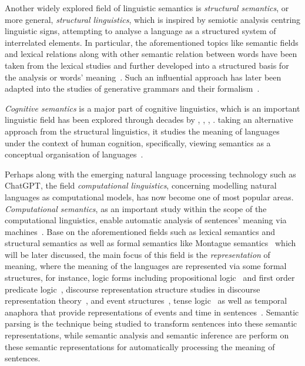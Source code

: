 Another widely explored field of linguistic semantics is \emph{structural semantics}, or more general, \emph{structural linguistics}, which is inspired by  semiotic analysis centring linguistic signs, attempting to analyse a language as a structured system of interrelated elements. In particular, the aforementioned topics like semantic fields and lexical relations along with other semantic relation between words have been taken from the lexical studies and further developed into a structured basis for the analysis or words' meaning~\citep{LexicalSemantics}. Such an influential approach has later been adapted into the studies of generative grammars and their formalism~\citep{Katz1963-KATTSO-3, Chomsky1975-CHOTLS}.

\emph{Cognitive semantics} is a major part of cognitive linguistics, which is an important linguistic field has been explored through decades by \citet{Johnson1987-JOHTBI}, \citet{alma9923109163502466}, \citet{alma993245163502466}, \citet{fauconnier1998}. taking an alternative approach from the structural linguistics, it studies the meaning of languages under the context of human cognition, specifically, viewing semantics as a conceptual organisation of languages~\citep{10.7551/mitpress/6847.001.0001, Croft_Cruse_2004}.

Perhaps along with the emerging natural language processing technology such as ChatGPT, the field \emph{computational linguistics}, concerning modelling natural languages as computational models, has now become one of most popular areas. \emph{Computational semantics}, as an important study within the scope of the computational linguistics, enable automatic analysis of sentences' meaning via machines~\citep{mitkov2022}. Base on the aforementioned fields such as lexical semantics and structural semantics as well as formal semantics like Montague semantics~\citep{Montague1970-MONEAA-2} which will be later discussed, the main focus of this field is the \emph{representation} of meaning, where the meaning of the languages are represented via some formal structures, for instance, logic forms including propositional logic~\citep{boole1854investigation} and first order predicate logic~\citep{Frege1879-FREBAF-2}, discourse representation structure studies in discourse representation theory~\citep{Kamp1993-KAMFDT}, and event structures~\citep{PUSTEJOVSKY199147}, tense logic~\citep{Prior1955-PRITAM, Kamp1968-KAMTLA} as well as temporal anaphora that provide representations of events and time in sentences~\citep{partee1884, hinrichs1986}. Semantic parsing is the technique being studied to transform sentences into these semantic representations, while semantic analysis and semantic inference are perform on these semantic representations for automatically processing the meaning of sentences.

